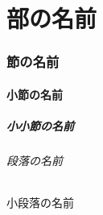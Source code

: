 \documentclass[a5j]{jarticle}
\begin{document}
 
\part{部の名前}
\section{節の名前}
\subsection{小節の名前}
\subsubsection{小小節の名前}
\paragraph{段落の名前}
\subparagraph{小段落の名前}
 
\end{document}
